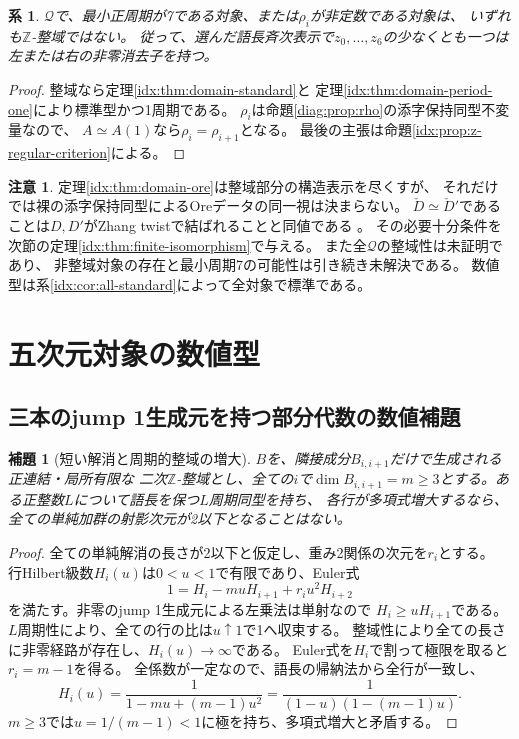 \documentclass[11pt,a4paper]{ltjsarticle}
\newtheorem{lemma}[theorem]{補題}
\newtheorem{corollary}[theorem]{系}
\theoremstyle{definition}
\newtheorem{remark}[theorem]{注意}
\begin{document}
\begin{corollary}\label{idx:cor:domain-boundary}
$\mathcal Q$で、最小正周期が7である対象、または$\rho_i$が非定数である対象は、
いずれも$\mathbb Z$-整域ではない。
従って、選んだ語長斉次表示で$z_0,\ldots,z_6$の少なくとも一つは
左または右の非零消去子を持つ。
\end{corollary}
\begin{proof}
整域なら定理\ref{idx:thm:domain-standard}と
定理\ref{idx:thm:domain-period-one}により標準型かつ1周期である。
$\rho_i$は命題\ref{diag:prop:rho}の添字保持同型不変量なので、
$A\simeq A(1)$なら$\rho_i=\rho_{i+1}$となる。
最後の主張は命題\ref{idx:prop:z-regular-criterion}による。
\end{proof}
\begin{remark}
定理\ref{idx:thm:domain-ore}は整域部分の構造表示を尽くすが、
それだけでは裸の添字保持同型によるOreデータの同一視は決まらない。
$\check D\simeq\check D'$であることは$D,D'$がZhang twistで結ばれることと同値である
\cite[Theorem 1.2, Corollary 4.4]{Sierra}。
その必要十分条件を次節の定理\ref{idx:thm:finite-isomorphism}で与える。
また全$\mathcal Q$の整域性は未証明であり、
非整域対象の存在と最小周期7の可能性は引き続き未解決である。
数値型は系\ref{idx:cor:all-standard}によって全対象で標準である。
\end{remark}



\section{五次元対象の数値型}\label{sec:three-light-numerics}
\subsection{三本のjump 1生成元を持つ部分代数の数値補題}
\begin{lemma}[短い解消と周期的整域の増大]
\label{genidx:lem:short-domain-resolution}
$B$を、隣接成分$B_{i,i+1}$だけで生成される正連結・局所有限な
二次$\mathbb Z$-整域とし、全ての$i$で$\dim B_{i,i+1}=m\geq3$とする。ある正整数$L$について語長を保つ$L$周期同型を持ち、
各行が多項式増大するなら、全ての単純加群の射影次元が2以下となることはない。
\end{lemma}
\begin{proof}
全ての単純解消の長さが2以下と仮定し、重み2関係の次元を$r_i$とする。
行Hilbert級数$H_i(u)$は$0<u<1$で有限であり、Euler式
\[
1=H_i-muH_{i+1}+r_i u^2H_{i+2}
\]
を満たす。非零のjump 1生成元による左乗法は単射なので
$H_i\geq uH_{i+1}$である。$L$周期性により、全ての行の比は$u\uparrow1$で1へ収束する。
整域性により全ての長さに非零経路が存在し、$H_i(u)\to\infty$である。
Euler式を$H_i$で割って極限を取ると$r_i=m-1$を得る。
全係数が一定なので、語長の帰納法から全行が一致し、
\[
H_i(u)=\frac1{1-mu+(m-1)u^2}
       =\frac1{(1-u)(1-(m-1)u)}.
\]
$m\geq3$では$u=1/(m-1)<1$に極を持ち、多項式増大と矛盾する。
\end{proof}
\end{document}

